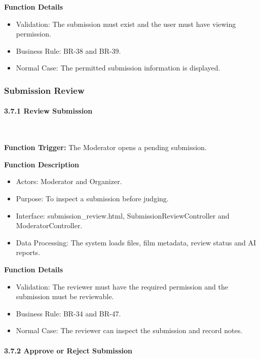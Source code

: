 \textbf{Function Details}
\begin{itemize}[leftmargin=1.5em, nosep]
    \item Validation: The submission must exist and the user must have viewing permission.
    \item Business Rule: BR-38 and BR-39.
    \item Normal Case: The permitted submission information is displayed.
\end{itemize}

\subsubsection{Submission Review}
\label{subsubsec:submission-review}

\paragraph*{3.7.1 Review Submission}\leavevmode\\[-0.5em]
\label{par:review-submission}

\textbf{Function Trigger:} The Moderator opens a pending submission.

\textbf{Function Description}
\begin{itemize}[leftmargin=1.5em, nosep]
    \item Actors: Moderator and Organizer.
    \item Purpose: To inspect a submission before judging.
    \item Interface: submission\_review.html, SubmissionReviewController and ModeratorController.
    \item Data Processing: The system loads files, film metadata, review status and AI reports.
\end{itemize}

\textbf{Function Details}
\begin{itemize}[leftmargin=1.5em, nosep]
    \item Validation: The reviewer must have the required permission and the submission must be reviewable.
    \item Business Rule: BR-34 and BR-47.
    \item Normal Case: The reviewer can inspect the submission and record notes.
\end{itemize}

\paragraph*{3.7.2 Approve or Reject Submission}\leavevmode\\[-0.5em]
\label{par:approve-reject-submission}

